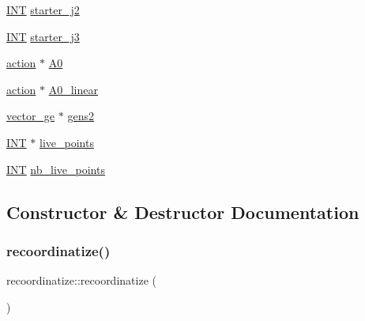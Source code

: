 \begin{DoxyCompactItemize}
\item 
\mbox{\hyperlink{galois_8h_a09fddde158a3a20bd2dcadb609de11dc}{I\+NT}} \mbox{\hyperlink{classrecoordinatize_addc82f25377059dd4bdba288287e2aa5}{starter\+\_\+j2}}
\item 
\mbox{\hyperlink{galois_8h_a09fddde158a3a20bd2dcadb609de11dc}{I\+NT}} \mbox{\hyperlink{classrecoordinatize_ab1f6956f684e3dff8da508dc1e745bb2}{starter\+\_\+j3}}
\item 
\mbox{\hyperlink{classaction}{action}} $\ast$ \mbox{\hyperlink{classrecoordinatize_ac9dc9f91eea10bd3ac7143f90fbcf8dc}{A0}}
\item 
\mbox{\hyperlink{classaction}{action}} $\ast$ \mbox{\hyperlink{classrecoordinatize_aeb1f44ca8cd109df01cbcead258a1f5a}{A0\+\_\+linear}}
\item 
\mbox{\hyperlink{classvector__ge}{vector\+\_\+ge}} $\ast$ \mbox{\hyperlink{classrecoordinatize_a6cb9e68705fb7a9402426181820e0aff}{gens2}}
\item 
\mbox{\hyperlink{galois_8h_a09fddde158a3a20bd2dcadb609de11dc}{I\+NT}} $\ast$ \mbox{\hyperlink{classrecoordinatize_aeb68174bcf3297e6972d2e825cd0a24e}{live\+\_\+points}}
\item 
\mbox{\hyperlink{galois_8h_a09fddde158a3a20bd2dcadb609de11dc}{I\+NT}} \mbox{\hyperlink{classrecoordinatize_a7d60c59e96944c7f8e8ff1c5c8da3d72}{nb\+\_\+live\+\_\+points}}
\end{DoxyCompactItemize}


\subsection{Constructor \& Destructor Documentation}
\mbox{\label{classrecoordinatize_a91e9ab3b29a54e13c3845aa840d4308b}} 
\subsubsection{\texorpdfstring{recoordinatize()}{recoordinatize()}}
{\footnotesize\ttfamily recoordinatize\+::recoordinatize (\begin{DoxyParamCaption}{ }\end{DoxyParamCaption})}

\mbox{\label{classrecoordinatize_a3dffd2980a9c6a971d4a45f9c7e5fa6f}} 
